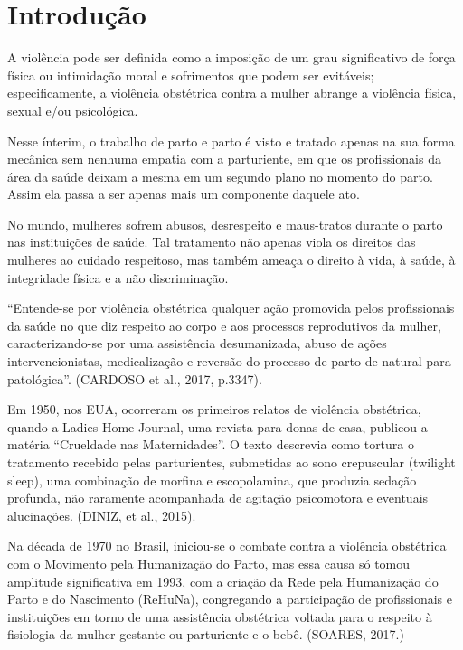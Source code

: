 \chapter{Introdução}
\label{cap:introducao}

A violência pode ser definida como a imposição de um grau significativo de força física ou intimidação moral e sofrimentos que podem ser evitáveis; especificamente, a violência obstétrica contra a mulher abrange a violência física, sexual e/ou psicológica. \cite{cardoso2017violencia}

Nesse ínterim, o trabalho de parto e parto é visto e tratado apenas na sua forma mecânica sem nenhuma empatia com a parturiente, em que os profissionais da área da saúde deixam a mesma em um segundo plano no momento do parto. Assim ela passa a ser apenas mais um componente daquele ato. \cite{cardoso2017violencia}

No mundo, mulheres sofrem abusos, desrespeito e maus-tratos durante o parto nas instituições de saúde. Tal tratamento não apenas viola os direitos das mulheres ao cuidado respeitoso, mas também ameaça o direito à vida, à saúde, à integridade física e a não discriminação. \cite{cardoso2017violencia}

“Entende-se por violência obstétrica qualquer ação promovida pelos profissionais da saúde no que diz respeito ao corpo e aos processos reprodutivos da mulher, caracterizando-se por uma assistência desumanizada, abuso de ações intervencionistas, medicalização e reversão do processo de parto de natural para patológica”. (CARDOSO et al., 2017, p.3347).


Em 1950, nos EUA, ocorreram os primeiros relatos de violência obstétrica, quando a Ladies Home Journal, uma revista para donas de casa, publicou a matéria “Crueldade nas Maternidades”. O texto descrevia como tortura o tratamento recebido pelas parturientes, submetidas ao sono crepuscular (twilight sleep), uma combinação de morfina e escopolamina, que produzia sedação profunda, não raramente acompanhada de agitação psicomotora e eventuais alucinações. (DINIZ, et al., 2015).

Na década de 1970 no Brasil, iniciou-se o combate contra a violência obstétrica com o Movimento pela Humanização do Parto, mas essa causa só tomou amplitude significativa em 1993, com a criação da Rede pela Humanização do Parto e do Nascimento (ReHuNa), congregando a participação de profissionais e instituições em torno de uma assistência obstétrica voltada para o respeito à fisiologia da mulher gestante ou parturiente e o bebê. (SOARES, 2017.)

